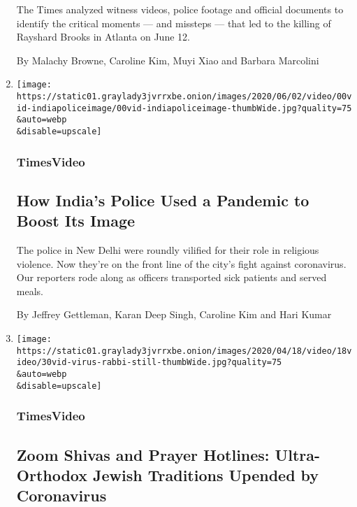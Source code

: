 \begin{enumerate}
  The Times analyzed witness videos, police footage and official
  documents to identify the critical moments --- and missteps --- that
  led to the killing of Rayshard Brooks in Atlanta on June 12.

  By Malachy Browne, Caroline Kim, Muyi Xiao and Barbara Marcolini
\item
  \href{/video/world/100000007141490/-india-police-pandemic-coronavirus.html}{}

  \texttt{[image: https://static01.graylady3jvrrxbe.onion/images/2020/06/02/video/00vid-indiapoliceimage/00vid-indiapoliceimage-thumbWide.jpg?quality=75\\\&auto=webp\\\&disable=upscale]}

  \hypertarget{timesvideo-2}{%
  \subsubsection{TimesVideo}\label{timesvideo-2}}

  \hypertarget{how-indias-police-used-a-pandemic-to-boost-its-image}{%
  \subsection{How India's Police Used a Pandemic to Boost Its
  Image}\label{how-indias-police-used-a-pandemic-to-boost-its-image}}

  The police in New Delhi were roundly vilified for their role in
  religious violence. Now they're on the front line of the city's fight
  against coronavirus. Our reporters rode along as officers transported
  sick patients and served meals.

  By Jeffrey Gettleman, Karan Deep Singh, Caroline Kim and Hari Kumar
\item
  \href{/video/us/100000007061978/coronavirus-ultra-orthodox-jewish-traditions.html}{}

  \texttt{[image: https://static01.graylady3jvrrxbe.onion/images/2020/04/18/video/18video/30vid-virus-rabbi-still-thumbWide.jpg?quality=75\\\&auto=webp\\\&disable=upscale]}

  \hypertarget{timesvideo-3}{%
  \subsubsection{TimesVideo}\label{timesvideo-3}}

  \hypertarget{zoom-shivas-and-prayer-hotlines-ultra-orthodox-jewish-traditions-upended-by-coronavirus}{%
  \subsection{Zoom Shivas and Prayer Hotlines: Ultra-Orthodox Jewish
  Traditions Upended by
  Coronavirus}\label{zoom-shivas-and-prayer-hotlines-ultra-orthodox-jewish-traditions-upended-by-coronavirus}}


\end{enumerate}
